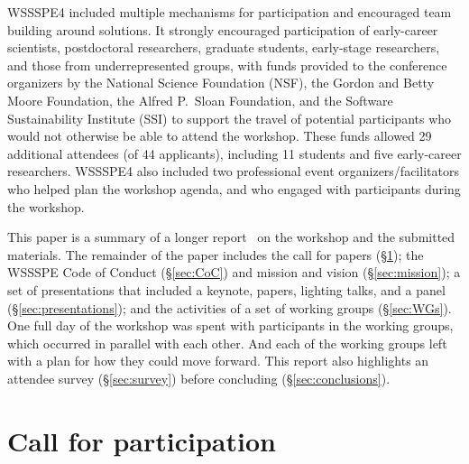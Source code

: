 \documentclass[11pt, oneside]{amsart}
\newcommand{\todo}[1]{{\color{blue}$\blacksquare$~\textsf{[TODO: #1]}}}
\begin{document}
WSSSPE4 included multiple mechanisms for participation and
encouraged team building around solutions. It strongly encouraged participation
of early-career scientists, postdoctoral researchers, graduate students,
early-stage researchers, and those from underrepresented groups,
with funds provided to the conference organizers by the National Science
Foundation (NSF), the Gordon and Betty Moore Foundation, the Alfred P.~Sloan Foundation, and the Software
Sustainability Institute (SSI) to support the travel of potential participants
who would not otherwise be able to attend the workshop. These
funds allowed 29 additional attendees %
(of 44 applicants), 
including 11 students and five early-career
researchers.
%
WSSSPE4 also included two professional event organizers/facilitators who helped
plan the workshop agenda,
and who engaged with participants during the workshop.

This paper is a summary of a longer report~\cite{WSSSPE4-report} on the workshop and the submitted materials.
The remainder of the paper includes the call for papers (\S\ref{sec:preworkshop}); the WSSSPE Code of Conduct (\S\ref{sec:CoC}) and mission and vision (\S\ref{sec:mission}); a set of presentations that included a keynote, papers, lighting talks, and a panel (\S\ref{sec:presentations}); and the activities of a set of working groups (\S\ref{sec:WGs}).  One full day of the
workshop was spent with participants in the working groups, which occurred in parallel
with each other.  And each of the working groups left with a plan for how they could move
forward.
This report also highlights an attendee survey (\S\ref{sec:survey}) before concluding (\S\ref{sec:conclusions}).



\section{Call for participation} \label{sec:preworkshop}
\end{document}
